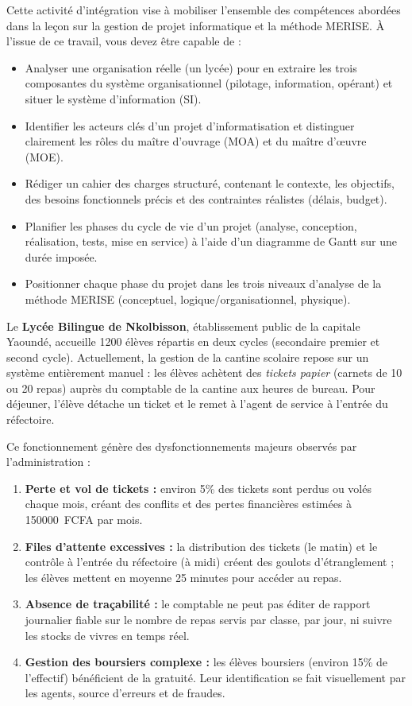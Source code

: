 \documentclass[11pt]{article}
\newcommand{\cle}[1]{{\popxbold\color{popdark}#1}}
\newcounter{popsec}
\newcounter{popsub}
\newcommand{\courssub}[1]{%
  \stepcounter{popsub}%
  \par\vspace{9pt}\noindent{\popxbold\fontsize{11.5}{13}\selectfont\color{popink}{\color{poporange}\thepopsec.\thepopsub}\hspace{6pt}#1}\par\nopagebreak\vspace{4pt}
}
\begin{document}
\courssub{Objectifs de l'activité}
Cette activité d'intégration vise à mobiliser l'ensemble des compétences abordées dans la leçon sur la gestion de projet informatique et la méthode MERISE. À l'issue de ce travail, vous devez être capable de :
\begin{itemize}
    \item Analyser une organisation réelle (un lycée) pour en extraire les trois composantes du système organisationnel (pilotage, information, opérant) et situer le système d'information (SI).
    \item Identifier les acteurs clés d'un projet d'informatisation et distinguer clairement les rôles du \cle{maître d'ouvrage} (MOA) et du \cle{maître d'œuvre} (MOE).
    \item Rédiger un \cle{cahier des charges} structuré, contenant le contexte, les objectifs, des besoins fonctionnels précis et des contraintes réalistes (délais, budget).
    \item Planifier les phases du cycle de vie d'un projet (analyse, conception, réalisation, tests, mise en service) à l'aide d'un \cle{diagramme de Gantt} sur une durée imposée.
    \item Positionner chaque phase du projet dans les trois niveaux d'analyse de la méthode \cle{MERISE} (conceptuel, logique/organisationnel, physique).
\end{itemize}

\courssub{Situation}
Le \textbf{Lycée Bilingue de Nkolbisson}, établissement public de la capitale Yaoundé, accueille \num{1200} élèves répartis en deux cycles (secondaire premier et second cycle). Actuellement, la gestion de la cantine scolaire repose sur un système entièrement manuel : les élèves achètent des \emph{tickets papier} (carnets de 10 ou 20 repas) auprès du comptable de la cantine aux heures de bureau. Pour déjeuner, l'élève détache un ticket et le remet à l'agent de service à l'entrée du réfectoire.

Ce fonctionnement génère des dysfonctionnements majeurs observés par l'administration :
\begin{enumerate}
    \item \textbf{Perte et vol de tickets :} environ 5\% des tickets sont perdus ou volés chaque mois, créant des conflits et des pertes financières estimées à \SI{150000}{FCFA} par mois.
    \item \textbf{Files d'attente excessives :} la distribution des tickets (le matin) et le contrôle à l'entrée du réfectoire (à midi) créent des goulots d'étranglement ; les élèves mettent en moyenne 25 minutes pour accéder au repas.
    \item \textbf{Absence de traçabilité :} le comptable ne peut pas éditer de rapport journalier fiable sur le nombre de repas servis par classe, par jour, ni suivre les stocks de vivres en temps réel.
    \item \textbf{Gestion des boursiers complexe :} les élèves boursiers (environ 15\% de l'effectif) bénéficient de la gratuité. Leur identification se fait visuellement par les agents, source d'erreurs et de fraudes.
\end{enumerate}
\end{document}
